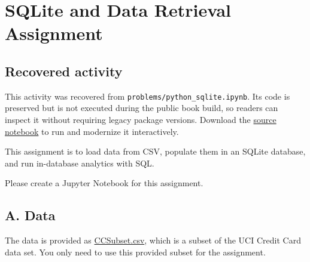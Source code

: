 \documentclass[
  letterpaper,
]{scrbook}
\begin{document}
\chapter*{SQLite and Data Retrieval
Assignment}\label{ch-lab-sqlite-assignment}


\section*{Recovered activity}\label{sec-lab-sqlite-assignment}


\begin{tcolorbox}[enhanced jigsaw, arc=.35mm, bottomrule=.15mm, bottomtitle=1mm, breakable, colback=white, colbacktitle=quarto-callout-note-color!10!white, colframe=quarto-callout-note-color-frame, coltitle=black, left=2mm, leftrule=.75mm, opacityback=0, opacitybacktitle=0.6, rightrule=.15mm, title=\textcolor{quarto-callout-note-color}{\faInfo}\hspace{0.5em}{Historical source and execution note}, titlerule=0mm, toprule=.15mm, toptitle=1mm]

This activity was recovered from \texttt{problems/python\_sqlite.ipynb}.
Its code is preserved but is not executed during the public book build,
so readers can inspect it without requiring legacy package versions.
Download the \href{../notebooks/sqlite-assignment.ipynb}{source
notebook} to run and modernize it interactively.

\end{tcolorbox}

This assignment is to load data from CSV, populate them in an SQLite
database, and run in-database analytics with SQL.

Please create a Jupyter Notebook for this assignment.

\section*{A. Data}\label{a.-data}


The data is provided as \href{../data/CCSubset.csv}{CCSubset.csv}, which
is a subset of the UCI Credit Card data set. You only need to use this
provided subset for the assignment.
\end{document}
